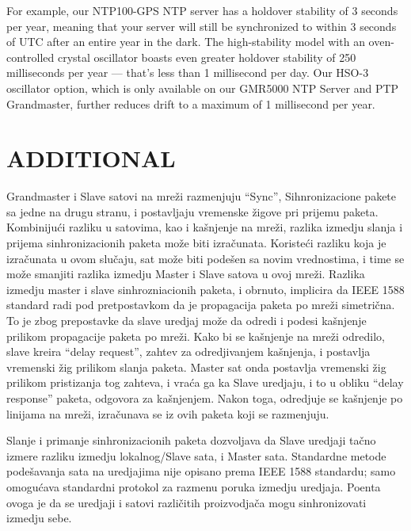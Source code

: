 \documentclass[a4paper,12pt, master]{etf}
\begin{document}
	For example, our NTP100-GPS NTP server has a holdover stability of 3 seconds per year,
	meaning that your server will still be synchronized to within 3 seconds of UTC after an
	entire year in the dark. The high-stability model with an oven-controlled crystal
	oscillator boasts even greater holdover stability of 250 milliseconds per year — that's
	less than 1 millisecond per day. Our HSO-3 oscillator option, which is only available on
	our GMR5000 NTP Server and PTP Grandmaster, further reduces drift to a maximum of 1
	millisecond per year.

	\newpage

	\chapter{ADDITIONAL}

	Grandmaster i Slave satovi na mre\v{z}i razmenjuju ``Sync'', Sihnronizacione pakete sa jedne na
	drugu stranu, i postavljaju vremenske \v{z}igove pri prijemu paketa. Kombiniju\'{c}i razliku u
	satovima, kao i ka\v{s}njenje na mre\v{z}i, razlika izmedju slanja i prijema sinhronizacionih
	paketa mo\v{z}e biti izra\v{c}unata. Koriste\'{c}i razliku koja je izra\v{c}unata u ovom slu\v{c}aju, sat
	mo\v{z}e biti pode\v{s}en sa novim vrednostima, i time se mo\v{z}e smanjiti razlika izmedju Master i
	Slave satova u ovoj mre\v{z}i. Razlika izmedju master i slave sinhrozniacionih paketa, i
	obrnuto, implicira da IEEE 1588 standard radi pod pretpostavkom da je propagacija paketa
	po mre\v{z}i simetri\v{c}na. To je zbog prepostavke da slave uredjaj mo\v{z}e da odredi i podesi
	ka\v{s}njenje prilikom propagacije paketa po mre\v{z}i. Kako bi se ka\v{s}njenje na mre\v{z}i odredilo,
	slave kreira ``delay request'', zahtev za odredjivanjem ka\v{s}njenja, i postavlja vremenski
	\v{z}ig prilikom slanja paketa. Master sat onda postavlja vremenski \v{z}ig prilikom pristizanja
	tog zahteva, i vra\'{c}a ga ka Slave uredjaju, i to u obliku ``delay response'' paketa, odgovora za
        ka\v{s}njenjem. Nakon toga, odredjuje se ka\v{s}njenje po linijama na mre\v{z}i, izra\v{c}unava
        se iz ovih paketa koji se razmenjuju.

	Slanje i primanje sinhronizacionih paketa dozvoljava da Slave uredjaji ta\v{c}no izmere
	razliku izmedju lokalnog/Slave sata, i Master sata. Standardne metode pode\v{s}avanja sata na
	uredjajima nije opisano prema IEEE 1588 standardu; samo omogu\'{c}ava standardni protokol za
	razmenu poruka izmedju uredjaja. Poenta ovoga je da se uredjaji i satovi razli\v{c}itih
	proizvodja\v{c}a mogu sinhronizovati izmedju sebe.
\end{document}
